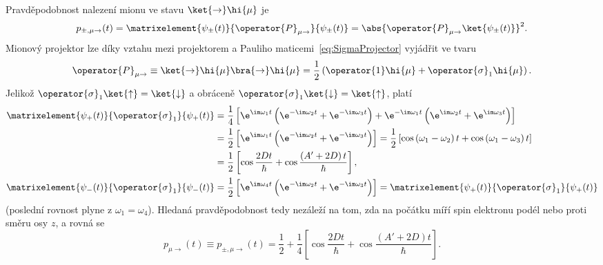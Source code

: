 \begin{solution}
\begin{enumerate}
		Pravděpodobnost nalezení mionu ve stavu $\ket{\rightarrow}\hi{\mu}$ je
		\begin{equation}
			p_{\pm,\mu\rightarrow}(t)
				=\matrixelement{\psi_{\pm}(t)}{\operator{P}_{\mu\rightarrow}}{\psi_{\pm}(t)}
				=\abs{\operator{P}_{\mu\rightarrow}\ket{\psi_{\pm}(t)}}^{2}.
		\end{equation}
		Mionový projektor lze díky vztahu mezi projektorem a Pauliho maticemi~\eqref{eq:SigmaProjector} vyjádřit ve tvaru
		\begin{equation}
			\operator{P}_{\mu\rightarrow}\equiv\ket{\rightarrow}\hi{\mu}\bra{\rightarrow}\hi{\mu}=\frac{1}{2}\left(\operator{1}\hi{\mu}+\operator{\sigma}_{1}\hi{\mu}\right).
		\end{equation}
		Jelikož $\operator{\sigma}_{1}\ket{\uparrow}=\ket{\downarrow}$ a obráceně $\operator{\sigma}_{1}\ket{\downarrow}=\ket{\uparrow}$, platí
		\begin{subequations}
			\begin{align}
				\matrixelement{\psi_{+}(t)}{\operator{\sigma}_{1}}{\psi_{+}(t)}
					&=\frac{1}{4}\left[\e^{\im\omega_{1}t}\left(\e^{-\im\omega_{2}t}+\e^{-\im\omega_{3}t}\right)
						+\e^{-\im\omega_{1}t}\left(\e^{\im\omega_{2}t}+\e^{\im\omega_{3}t}\right)\right]\nonumber\\
					&=\frac{1}{2}\real\left[\e^{\im\omega_{1}t}\left(\e^{-\im\omega_{2}t}+\e^{-\im\omega_{3}t}\right)\right]
					 =\frac{1}{2}\left[\cos\left(\omega_{1}-\omega_{2}\right)t+\cos\left(\omega_{1}-\omega_{3}\right)t\right]\nonumber\\
					&=\frac{1}{2}\left[\cos{\frac{2Dt}{\hbar}}+\cos\frac{\left(A'+2D\right)t}{\hbar}\right],\\
				\matrixelement{\psi_{-}(t)}{\operator{\sigma}_{1}}{\psi_{-}(t)}
					&=\frac{1}{2}\real\left[\e^{\im\omega_{4}t}\left(\e^{-\im\omega_{2}t}+\e^{-\im\omega_{3}t}\right)\right]
					 =\matrixelement{\psi_{+}(t)}{\operator{\sigma}_{1}}{\psi_{+}(t)}
			\end{align}				
		\end{subequations}
		(poslední rovnost plyne z $\omega_{1}=\omega_{4}$).
		Hledaná pravděpodobnost tedy nezáleží na tom, zda na počátku míří spin elektronu podél nebo proti směru osy $z$, a rovná se
		\begin{equation}
			p_{\mu\rightarrow}(t)
				\equiv p_{\pm,\mu\rightarrow}(t)
				=\frac{1}{2}+\frac{1}{4}\left[\cos{\frac{2Dt}{\hbar}}+\cos\frac{\left(A'+2D\right)t}{\hbar}\right].
		\end{equation}
		

\end{enumerate}
\end{solution}
